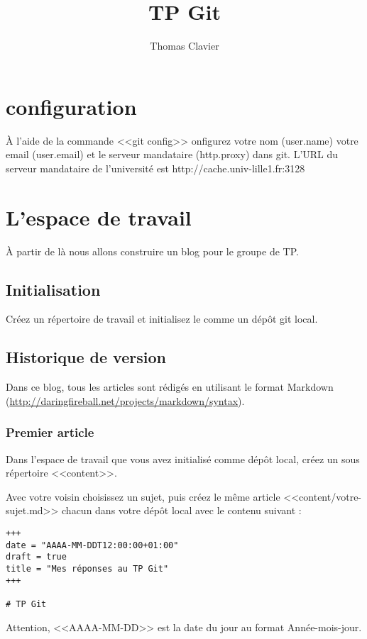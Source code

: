 \documentclass[a4paper]{article}
\title{TP Git}
\author{Thomas Clavier}
\date{}
\begin{document}
\maketitle

\section{configuration}

À l'aide de la commande <<git config>> onfigurez votre nom (user.name) votre email (user.email) et le serveur mandataire (http.proxy) dans git. L'URL du serveur mandataire de l'université est http://cache.univ-lille1.fr:3128

\section{L'espace de travail}

À partir de là nous allons construire un blog pour le groupe de TP.

\subsection{Initialisation}
Créez un répertoire de travail et initialisez le comme un dépôt git local.

\subsection{Historique de version}
Dans ce blog, tous les articles sont rédigés en utilisant le format Markdown (\url{http://daringfireball.net/projects/markdown/syntax}).

\subsubsection{Premier article}
Dans l'espace de travail que vous avez initialisé comme dépôt local, créez un sous répertoire <<content>>.

Avec votre voisin choisissez un sujet, puis créez le même article <<content/votre-sujet.md>> chacun dans votre dépôt local avec le contenu suivant : 

\begin{verbatim}
+++
date = "AAAA-MM-DDT12:00:00+01:00"
draft = true
title = "Mes réponses au TP Git"
+++

# TP Git
\end{verbatim}

Attention, <<AAAA-MM-DD>> est la date du jour au format Année-mois-jour.
\end{document}
